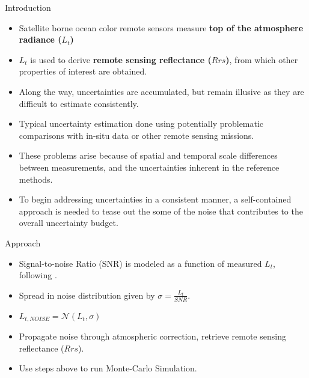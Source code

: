 \documentclass[final]{beamer}
\newlength{\onecolwid}
\begin{document}
\begin{frame}[t]
\begin{columns}[t]
\begin{column}{\onecolwid}
\begin{block}{Introduction}
\begin{itemize}
\item Satellite borne ocean color remote sensors measure \textbf{top of the atmosphere radiance ($L_t$)}
\item $L_t$ is used to derive \textbf{remote sensing reflectance ($Rrs$)}, from which other  properties of interest are obtained.
\item Along the way, uncertainties are accumulated, but remain illusive as they are difficult to estimate consistently.
\item Typical uncertainty estimation done using potentially problematic comparisons with in-situ data or other remote sensing missions\cite{BW:2006,Tle:2000,Hu:2013}.
\item These problems arise because of spatial and temporal scale differences between measurements, and the uncertainties inherent in the reference methods.
\item To begin addressing uncertainties in a consistent manner, a self-contained approach is needed to tease out the some of the noise that contributes to the overall uncertainty budget.
\end{itemize}
\end{block}



\begin{block}{Approach}
\begin{itemize}
\item Signal-to-noise Ratio (SNR) is modeled as a function of measured $L_t$, following \cite{Barnes:1994}.
\item Spread in noise distribution given by $\sigma = \frac{L_t}{SNR}$.
\item $L_{t,NOISE} = \mathcal{N}(L_t, \sigma)$
\item Propagate noise through atmospheric correction, retrieve remote sensing reflectance ($Rrs$).
\item Use steps above to run Monte-Carlo Simulation.
\end{itemize}
\end{block}



\end{column}
\end{columns}
\end{frame}
\end{document}
